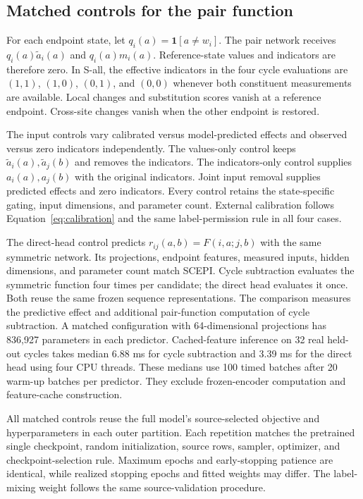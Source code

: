 \documentclass{llncs}
\begin{document}
\subsection*{Matched controls for the pair function}

For each endpoint state, let $q_i(a)=\mathbf{1}[a\neq w_i]$. The pair network receives $q_i(a)\widetilde a_i(a)$ and $q_i(a)m_i(a)$. Reference-state values and indicators are therefore zero. In S-all, the effective indicators in the four cycle evaluations are $(1,1)$, $(1,0)$, $(0,1)$, and $(0,0)$ whenever both constituent measurements are available. Local changes and substitution scores vanish at a reference endpoint. Cross-site changes vanish when the other endpoint is restored.

The input controls vary calibrated versus model-predicted effects and observed versus zero indicators independently. The values-only control keeps $\widetilde a_i(a),\widetilde a_j(b)$ and removes the indicators. The indicators-only control supplies $a_i(a),a_j(b)$ with the original indicators. Joint input removal supplies predicted effects and zero indicators. Every control retains the state-specific gating, input dimensions, and parameter count. External calibration follows Equation~\eqref{eq:calibration} and the same label-permission rule in all four cases.

The direct-head control predicts $r_{ij}(a,b)=F(i,a;j,b)$ with the same symmetric network. Its projections, endpoint features, measured inputs, hidden dimensions, and parameter count match SCEPI. Cycle subtraction evaluates the symmetric function four times per candidate; the direct head evaluates it once. Both reuse the same frozen sequence representations. The comparison measures the predictive effect and additional pair-function computation of cycle subtraction. A matched configuration with 64-dimensional projections has 836,927 parameters in each predictor. Cached-feature inference on 32 real held-out cycles takes median 6.88 ms for cycle subtraction and 3.39 ms for the direct head using four CPU threads. These medians use 100 timed batches after 20 warm-up batches per predictor. They exclude frozen-encoder computation and feature-cache construction.

All matched controls reuse the full model's source-selected objective and hyperparameters in each outer partition. Each repetition matches the pretrained single checkpoint, random initialization, source rows, sampler, optimizer, and checkpoint-selection rule. Maximum epochs and early-stopping patience are identical, while realized stopping epochs and fitted weights may differ. The label-mixing weight follows the same source-validation procedure.
\end{document}
